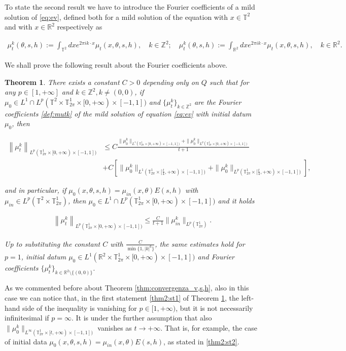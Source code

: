 \documentclass[a4paper,10pt,reqno]{amsart}
\newtheorem{theorem}{Theorem}[section]
\numberwithin{equation}{subsection}
\numberwithin{figure}{subsection}
\begin{document}
To state the second result we have to introduce the Fourier coefficients of a mild solution of \eqref{eq:ev}, defined both for a mild solution of the equation with $x\in\mathbb{T}^2$ and with $x\in\mathbb{R}^2$ respectively as

{\scriptsize\begin{align}\label{def:mutk}
\mu_t^k(\theta,s,h):=\int_{\mathbb{T}^2}dxe^{2\pi ik\cdot x}\mu_t(x,\theta,s,h),\quad k\in\mathbb{Z}^2;\quad\mu_t^k(\theta,s,h):=\int_{\mathbb{R}^2}dxe^{2\pi ik\cdot x}\mu_t(x,\theta,s,h),\quad k\in\mathbb{R}^2.
\end{align}}

We shall prove the following result about the Fourier coefficients above.
\begin{theorem}\label{thm:mutk}
There exists a constant $C>0$ depending only on $Q$ such that for any $p\in[1,+\infty]$ and $k\in\mathbb{Z}^2,k\neq(0,0)$, if $\mu_0\in L^1\cap L^p(\mathbb{T}^2\times\mathbb{T}^1_{2\pi}\times[0,+\infty)\times[-1,1])$ and $\{\mu_t^k\}_{k\in\mathbb{Z}^2}$ are the Fourier coefficients \eqref{def:mutk} of the mild solution of equation \eqref{eq:ev} with initial datum $\mu_0$, then

{\small\begin{align}
\nonumber\left\|\mu_t^k\right\|_{L^p(\mathbb{T}^1_{2\pi}\times[0,+\infty)\times[-1,1])}&\leq C\frac{\|\mu_0^k\|_{L^1(\mathbb{T}^1_{2\pi}\times[0,+\infty)\times[-1,1])}+\|\mu_0^k\|_{L^p(\mathbb{T}^1_{2\pi}\times[0,+\infty)\times[-1,1])}}{t+1}
\\
\label{thm2:st1}&+C\left[\|\mu_0^k\|_{L^1(\mathbb{T}^1_{2\pi}\times[\frac{t}{4},+\infty)\times[-1,1])}+\|\mu_0^k\|_{L^p(\mathbb{T}^1_{2\pi}\times[\frac{t}{4},+\infty)\times[-1,1])}\right],
\end{align}}

and in particular, if $\mu_0(x,\theta,s,h)=\mu_{in}(x,\theta)E(s,h)$ with $\mu_{in}\in L^p(\mathbb{T}^2\times\mathbb{T}^1_{2\pi})$, then $\mu_0\in L^1\cap L^p(\mathbb{T}^1_{2\pi}\times[0,+\infty)\times[-1,1])$ and it holds 

\begin{align}\label{thm2:st2}
\left\|\mu_t^k\right\|_{L^p(\mathbb{T}^1_{2\pi}\times[0,+\infty)\times[-1,1])}\leq \frac{C}{t+1}\|\mu_{in}^k\|_{L^p(\mathbb{T}^1_{2\pi})}.
\end{align}

Up to substituting the constant $C$ with $\frac{C}{\min\{1,|k|^6\}}$, the same estimates hold for $p=1$, initial datum $\mu_0\in L^1(\mathbb{R}^2\times\mathbb{T}^1_{2\pi}\times[0,+\infty)\times[-1,1])$ and Fourier coefficients $\{\mu_t^k\}_{k\in\mathbb{R}^2\setminus\{(0,0)\}}$.
\end{theorem}
As we commented before about Theorem \ref{thm:convergenza_v,s,h}, also in this case we can notice that, in the first statement \eqref{thm2:st1} of Theorem \ref{thm:mutk}, the left-hand side of the inequality is vanishing for $p\in[1,+\infty)$, but it is not necessarily infinitesimal if $p=\infty$. It is under the further assumption that also $\|\mu_0^k\|_{L^{\infty}(\mathbb{T}^1_{2\pi}\times[t,+\infty)\times[-1,1])}$ vanishes as $t\to+\infty$. That is, for example, the case of initial data $\mu_0(x,\theta,s,h)=\mu_{in}(x,\theta)E(s,h)$, as stated in \eqref{thm2:st2}.
\end{document}

